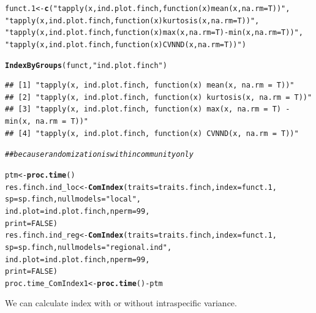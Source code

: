 \documentclass[12pt]{article}\usepackage[]{graphicx}\usepackage[]{color}
\makeatletter
\newcommand{\hlnum}[1]{\textcolor[rgb]{0.686,0.059,0.569}{#1}}%
\newcommand{\hlstr}[1]{\textcolor[rgb]{0.192,0.494,0.8}{#1}}%
\newcommand{\hlcom}[1]{\textcolor[rgb]{0.678,0.584,0.686}{\textit{#1}}}%
\newcommand{\hlopt}[1]{\textcolor[rgb]{0,0,0}{#1}}%
\newcommand{\hlstd}[1]{\textcolor[rgb]{0.345,0.345,0.345}{#1}}%
\newcommand{\hlkwb}[1]{\textcolor[rgb]{0.69,0.353,0.396}{#1}}%
\newcommand{\hlkwc}[1]{\textcolor[rgb]{0.333,0.667,0.333}{#1}}%
\newcommand{\hlkwd}[1]{\textcolor[rgb]{0.737,0.353,0.396}{\textbf{#1}}}%
\newenvironment{kframe}{%
 \def\at@end@of@kframe{}%
 \ifinner\ifhmode%
  \def\at@end@of@kframe{\end{minipage}}%
  \begin{minipage}{\columnwidth}%
 \fi\fi%
 \def\FrameCommand##1{\hskip\@totalleftmargin \hskip-\fboxsep
 \colorbox{shadecolor}{##1}\hskip-\fboxsep
     \hskip-\linewidth \hskip-\@totalleftmargin \hskip\columnwidth}%
 \MakeFramed {\advance\hsize-\width
   \@totalleftmargin\z@ \linewidth\hsize
   \@setminipage}}%
 {\par\unskip\endMakeFramed%
 \at@end@of@kframe}
\newenvironment{knitrout}{}{} %
\makeatother
\begin{document}
\begin{knitrout}
\color{fgcolor}\begin{kframe}
\begin{alltt}
\hlstd{funct.1}\hlkwb{<-}\hlkwd{c}\hlstd{(}\hlstr{"tapply(x, ind.plot.finch, function(x) mean(x, na.rm = T))"}\hlstd{,}
     \hlstr{"tapply(x, ind.plot.finch, function(x) kurtosis(x, na.rm = T))"}\hlstd{,}
     \hlstr{"tapply(x, ind.plot.finch, function(x) max(x, na.rm = T)-min(x, na.rm = T))"}\hlstd{,}
     \hlstr{"tapply(x, ind.plot.finch, function(x) CVNND(x, na.rm = T))"} \hlstd{)}

\hlkwd{IndexByGroups}\hlstd{(funct,} \hlstr{"ind.plot.finch"}\hlstd{)}
\end{alltt}
\begin{verbatim}
## [1] "tapply(x, ind.plot.finch, function(x) mean(x, na.rm = T))"                   
## [2] "tapply(x, ind.plot.finch, function(x) kurtosis(x, na.rm = T))"               
## [3] "tapply(x, ind.plot.finch, function(x) max(x, na.rm = T) - min(x, na.rm = T))"
## [4] "tapply(x, ind.plot.finch, function(x) CVNND(x, na.rm = T))"
\end{verbatim}
\begin{alltt}
\hlcom{##because randomization is within community only}

\hlstd{ptm} \hlkwb{<-} \hlkwd{proc.time}\hlstd{()}
\hlstd{res.finch.ind_loc}\hlkwb{<-}\hlkwd{ComIndex}\hlstd{(}\hlkwc{traits} \hlstd{= traits.finch,} \hlkwc{index} \hlstd{= funct.1,}
                            \hlkwc{sp} \hlstd{= sp.finch,} \hlkwc{nullmodels} \hlstd{=} \hlstr{"local"}\hlstd{,}
                            \hlkwc{ind.plot} \hlstd{= ind.plot.finch,} \hlkwc{nperm} \hlstd{=} \hlnum{99}\hlstd{,}
                            \hlkwc{print} \hlstd{=} \hlnum{FALSE}\hlstd{)}
\hlstd{res.finch.ind_reg}\hlkwb{<-}\hlkwd{ComIndex}\hlstd{(}\hlkwc{traits} \hlstd{= traits.finch,} \hlkwc{index} \hlstd{= funct.1,}
                            \hlkwc{sp} \hlstd{= sp.finch,} \hlkwc{nullmodels} \hlstd{=} \hlstr{"regional.ind"}\hlstd{,}
                            \hlkwc{ind.plot} \hlstd{= ind.plot.finch,} \hlkwc{nperm} \hlstd{=} \hlnum{99}\hlstd{,}
                            \hlkwc{print} \hlstd{=} \hlnum{FALSE}\hlstd{)}
\hlstd{proc.time_ComIndex1} \hlkwb{<-} \hlkwd{proc.time}\hlstd{()} \hlopt{-} \hlstd{ptm}
\end{alltt}
\end{kframe}
\end{knitrout}


We can calculate index with or without intraspecific variance.
\end{document}

